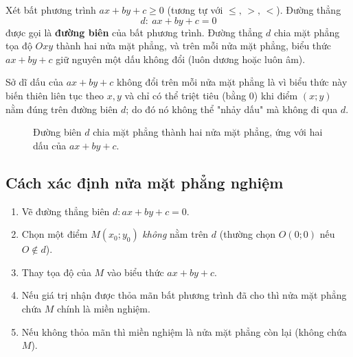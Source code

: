 \documentclass[12pt,a4paper]{report}
\begin{document}
\begin{definitionbox}
Xét bất phương trình $ax+by+c\ge 0$ (tương tự với $\le,\,>,\,<$). Đường thẳng
\[
d:\ ax+by+c=0
\]
được gọi là \textbf{đường biên} của bất phương trình. Đường thẳng $d$ chia mặt phẳng tọa độ $Oxy$ thành hai nửa mặt phẳng, và trên mỗi nửa mặt phẳng, biểu thức $ax+by+c$ giữ nguyên một dấu không đổi (luôn dương hoặc luôn âm).
\end{definitionbox}

Sở dĩ dấu của $ax+by+c$ không đổi trên mỗi nửa mặt phẳng là vì biểu thức này biến thiên liên tục theo $x,y$ và chỉ có thể triệt tiêu (bằng $0$) khi điểm $(x;y)$ nằm đúng trên đường biên $d$; do đó nó không thể "nhảy dấu" mà không đi qua $d$.

\begin{figure}[htbp]
\centering
{}
\caption{Đường biên $d$ chia mặt phẳng thành hai nửa mặt phẳng, ứng với hai dấu của $ax+by+c$.}
\label{fig:duong-bien}
\end{figure}

\subsection{Cách xác định nửa mặt phẳng nghiệm}

\begin{methodbox}
\begin{enumerate}
\item Vẽ đường thẳng biên $d: ax+by+c=0$.
\item Chọn một điểm $M(x_0;y_0)$ \emph{không} nằm trên $d$ (thường chọn $O(0;0)$ nếu $O\notin d$).
\item Thay tọa độ của $M$ vào biểu thức $ax+by+c$.
\item Nếu giá trị nhận được thỏa mãn bất phương trình đã cho thì nửa mặt phẳng chứa $M$ chính là miền nghiệm.
\item Nếu không thỏa mãn thì miền nghiệm là nửa mặt phẳng còn lại (không chứa $M$).
\end{enumerate}
\end{methodbox}
\end{document}
